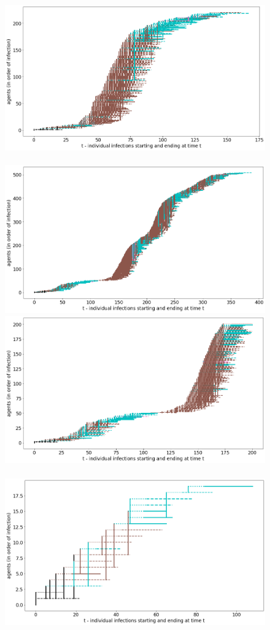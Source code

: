 \documentclass[graybox]{svmult}
\begin{document}
\begin{figure}[t]
\center
\includegraphics[scale=0.16]{withShort1.png}~~~\includegraphics[scale=0.16]{withShort1A.png} 
\center
\includegraphics[scale=0.16]{withShort1A200.png}~~~\includegraphics[scale=0.16]{withShort1B.png} \\

\end{figure}
\end{document}
